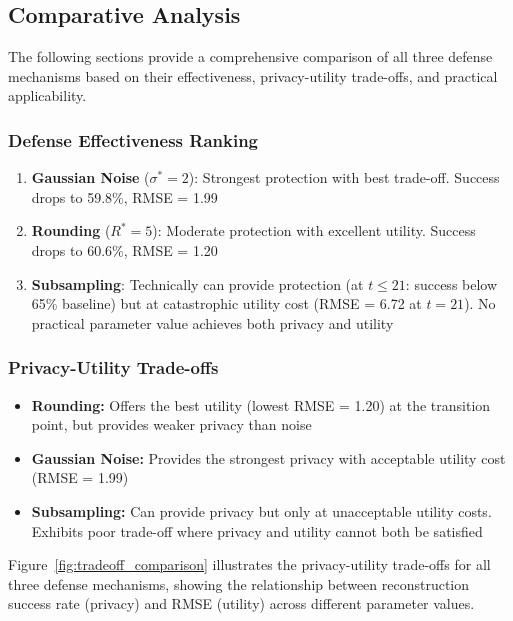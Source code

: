 \documentclass[11pt,letterpaper]{article}
\begin{document}
\subsection{Comparative Analysis}

The following sections provide a comprehensive comparison of all three defense mechanisms based on their effectiveness, privacy-utility trade-offs, and practical applicability.

\subsubsection{Defense Effectiveness Ranking}

\begin{enumerate}[leftmargin=*]
    \item \textbf{Gaussian Noise} ($\sigma^* = 2$): Strongest protection with best trade-off. Success drops to 59.8\%, RMSE = 1.99
    \item \textbf{Rounding} ($R^* = 5$): Moderate protection with excellent utility. Success drops to 60.6\%, RMSE = 1.20
    \item \textbf{Subsampling}: Technically can provide protection (at $t \leq 21$: success below 65\% baseline) but at catastrophic utility cost (RMSE = 6.72 at $t=21$). No practical parameter value achieves both privacy and utility
\end{enumerate}

\subsubsection{Privacy-Utility Trade-offs}

\begin{itemize}[leftmargin=*]
    \item \textbf{Rounding:} Offers the best utility (lowest RMSE = 1.20) at the transition point, but provides weaker privacy than noise
    \item \textbf{Gaussian Noise:} Provides the strongest privacy with acceptable utility cost (RMSE = 1.99)
    \item \textbf{Subsampling:} Can provide privacy but only at unacceptable utility costs. Exhibits poor trade-off where privacy and utility cannot both be satisfied
\end{itemize}

Figure~\ref{fig:tradeoff_comparison} illustrates the privacy-utility trade-offs for all three defense mechanisms, showing the relationship between reconstruction success rate (privacy) and RMSE (utility) across different parameter values.
\end{document}
